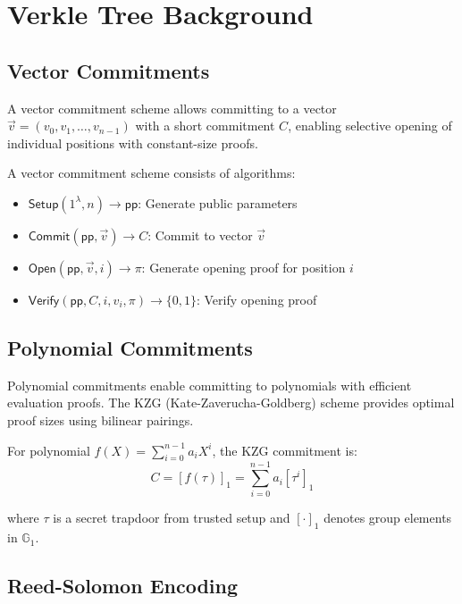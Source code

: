 \section{Verkle Tree Background}


\subsection{Vector Commitments}

A vector commitment scheme allows committing to a vector $\vec{v} = (v_0, v_1, \ldots, v_{n-1})$ with a short commitment $C$, enabling selective opening of individual positions with constant-size proofs.

\begin{definition}
A vector commitment scheme consists of algorithms:
\begin{itemize}
    \item $\mathsf{Setup}(1^\lambda, n) \rightarrow \mathsf{pp}$: Generate public parameters
    \item $\mathsf{Commit}(\mathsf{pp}, \vec{v}) \rightarrow C$: Commit to vector $\vec{v}$
    \item $\mathsf{Open}(\mathsf{pp}, \vec{v}, i) \rightarrow \pi$: Generate opening proof for position $i$
    \item $\mathsf{Verify}(\mathsf{pp}, C, i, v_i, \pi) \rightarrow \{0,1\}$: Verify opening proof
\end{itemize}
\end{definition}

\subsection{Polynomial Commitments}

Polynomial commitments enable committing to polynomials with efficient evaluation proofs. The KZG (Kate-Zaverucha-Goldberg) scheme provides optimal proof sizes using bilinear pairings.

For polynomial $f(X) = \sum_{i=0}^{n-1} a_i X^i$, the KZG commitment is:
\begin{equation}
    C = [f(\tau)]_1 = \sum_{i=0}^{n-1} a_i[\tau^i]_1
\end{equation}

where $\tau$ is a secret trapdoor from trusted setup and $[\cdot]_1$ denotes group elements in $\mathbb{G}_1$.

\subsection{Reed-Solomon Encoding}

